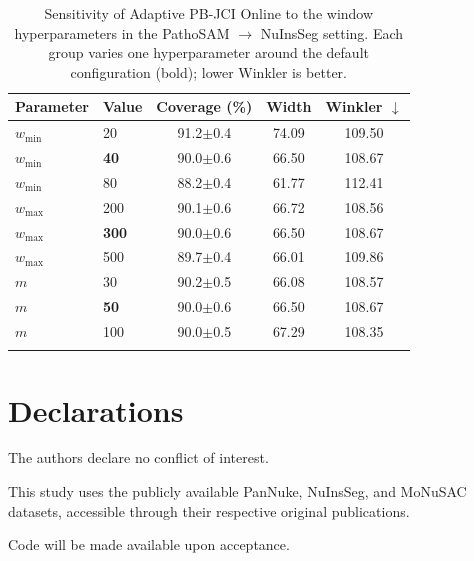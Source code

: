 \documentclass[pdflatex,sn-mathphys-num]{sn-jnl}
\begin{document}
\begin{appendices}
\begin{table}[htbp]
\caption{Sensitivity of Adaptive PB-JCI Online to the window hyperparameters in the
PathoSAM $\to$ NuInsSeg setting. Each group varies one hyperparameter around the
default configuration (bold); lower Winkler is better.}
\label{tab:sensitivity}
\centering
\small
\begin{tabular}{@{}llccc@{}}
\toprule
Parameter & Value & Coverage (\%) & Width & Winkler $\downarrow$ \\
\midrule
$w_{\min}$ & 20 & 91.2$\pm$0.4 & 74.09 & 109.50 \\
$w_{\min}$ & \textbf{40} & 90.0$\pm$0.6 & 66.50 & 108.67 \\
$w_{\min}$ & 80 & 88.2$\pm$0.4 & 61.77 & 112.41 \\
\midrule
$w_{\max}$ & 200 & 90.1$\pm$0.6 & 66.72 & 108.56 \\
$w_{\max}$ & \textbf{300} & 90.0$\pm$0.6 & 66.50 & 108.67 \\
$w_{\max}$ & 500 & 89.7$\pm$0.4 & 66.01 & 109.86 \\
\midrule
$m$ & 30 & 90.2$\pm$0.5 & 66.08 & 108.57 \\
$m$ & \textbf{50} & 90.0$\pm$0.6 & 66.50 & 108.67 \\
$m$ & 100 & 90.0$\pm$0.5 & 67.29 & 108.35 \\
\botrule
\end{tabular}
\end{table}

\end{appendices}

\backmatter


\section*{Declarations}

 The authors declare no conflict of interest.


 This study uses the publicly available PanNuke, NuInsSeg,
and MoNuSAC datasets, accessible through their respective original publications.

 Code will be made available upon acceptance.



\end{document}
